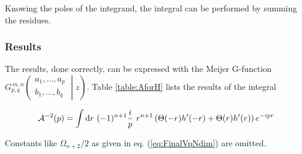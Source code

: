 \documentclass[10pt,a4paper, fleqn]{article}
\begin{document}
Knowing the poles of the integrand, the integral can be performed by summing the residues.

\subsubsection{Results}
The results, done correctly, can be expressed with the Meijer G-function $\displaystyle
G_{p,q}^{\,m,n} \left( \left. \begin{matrix} a_1, \dots, a_p \\ b_1, \dots, b_q \end{matrix}\; \right| \; z \right)$. Table \ref{table:AforH} lists the results of the integral

\begin{equation}
{\cal A}^{-2}(p) = 
\int \mathrm{d} r~(-1)^{n+1} \frac ip ~r^{n+1} \left(\Theta(-r) h'(-r) + \Theta(r) h'(r) \right) e^{-ipr}
\end{equation}

Constants like $\Omega_{n+2}/2$ as given in eq. (\ref{eq:FinalVpNdim}) are omitted.
\end{document}
